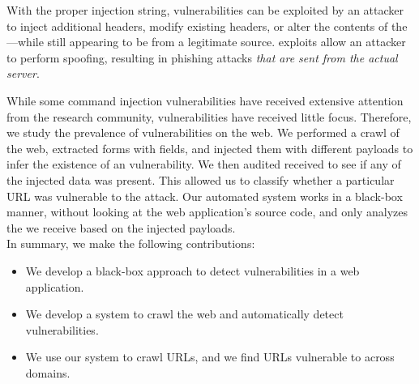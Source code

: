 
With the proper injection string, \ehi vulnerabilities can be exploited by an attacker to inject additional headers, modify existing headers, or alter the contents of the \email---while still appearing to be from a legitimate source. \ehi exploits allow an attacker to perform \email spoofing, resulting in phishing attacks \emph{that are sent from the actual \email server}.


While some command injection vulnerabilities have received extensive attention from the research community, \ehi vulnerabilities have received little focus. Therefore, we study the prevalence of \ehi vulnerabilities on the web. We performed a crawl of the web, extracted forms with \email fields, and injected them with different payloads to infer the existence of an \ehi vulnerability. We then audited received \emails to see if any of the injected data was present. This allowed us to classify whether a particular URL was vulnerable to the attack. Our automated system works in a black-box manner, without looking at the web application's source code, and only analyzes the \emails we receive based on the injected payloads.
\\

\noindent{}In summary, we make the following contributions:

\begin{itemize}

\item We develop a black-box approach to detect \ehi vulnerabilities in a web application.

\item We develop a system to crawl the web and automatically detect \ehi vulnerabilities.

\item We use our system to crawl \urls URLs, and we find \success URLs vulnerable to \ehi across \domains domains. 

\end{itemize}
